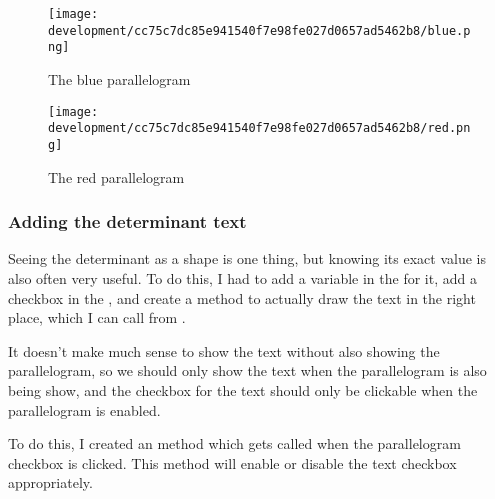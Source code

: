 \documentclass[../development.tex]{subfiles}
\begin{document}
\begin{figure}[H]
\begin{minipage}{0.48\linewidth}
	\centering
	\texttt{[image: development/cc75c7dc85e941540f7e98fe027d0657ad5462b8/blue.png]}
	\caption{The blue parallelogram}
	\label{fig:development:cc75c7dc85e941540f7e98fe027d0657ad5462b8:blue.png}
\end{minipage}\hfill
\begin{minipage}{0.48\linewidth}
	\centering
	\texttt{[image: development/cc75c7dc85e941540f7e98fe027d0657ad5462b8/red.png]}
	\caption{The red parallelogram}
	\label{fig:development:cc75c7dc85e941540f7e98fe027d0657ad5462b8:red.png}
\end{minipage}
\vspace{-1em}
\end{figure}

\subsubsection{Adding the determinant text\label{development:adding-display-settings:adding-the-determinant-text}}

Seeing the determinant as a shape is one thing, but knowing its exact value is also often very useful. To do this, I had to add a variable in the  for it, add a checkbox in the , and create a method to actually draw the text in the right place, which I can call from .




It doesn't make much sense to show the text without also showing the parallelogram, so we should only show the text when the parallelogram is also being show, and the checkbox for the text should only be clickable when the parallelogram is enabled.

To do this, I created an  method which gets called when the parallelogram checkbox is clicked. This method will enable or disable the text checkbox appropriately.



\end{document}
